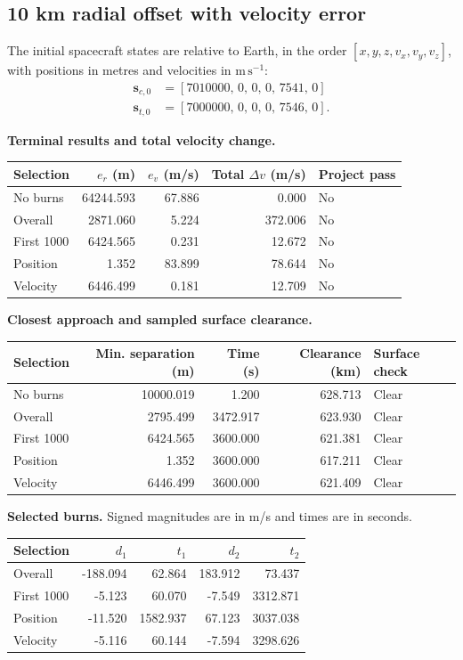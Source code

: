 \subsection{10 km radial offset with velocity error}
The initial spacecraft states are relative to Earth, in the order
$[x,y,z,v_x,v_y,v_z]$, with positions in metres and velocities in
$\mathrm{m\,s^{-1}}$:
\begin{align*}
\mathbf s_{c,0}&=[7010000,\,0,\,0,\,0,\,7541,\,0]\\
\mathbf s_{t,0}&=[7000000,\,0,\,0,\,0,\,7546,\,0].
\end{align*}
\par\noindent\textbf{Terminal results and total velocity change.}
\begin{center}
\begin{tabular}{lrrrl}
\toprule
Selection & $e_r$ (m) & $e_v$ (m/s) & Total $\Delta v$ (m/s) & Project pass\\
\midrule
No burns & 64244.593 & 67.886 & 0.000 & No\\
Overall & 2871.060 & 5.224 & 372.006 & No\\
First 1000 & 6424.565 & 0.231 & 12.672 & No\\
Position & 1.352 & 83.899 & 78.644 & No\\
Velocity & 6446.499 & 0.181 & 12.709 & No\\
\bottomrule
\end{tabular}
\end{center}
\par\noindent\textbf{Closest approach and sampled surface clearance.}
\begin{center}
\begin{tabular}{lrrrl}
\toprule
Selection & Min. separation (m) & Time (s) & Clearance (km) & Surface check\\
\midrule
No burns & 10000.019 & 1.200 & 628.713 & Clear\\
Overall & 2795.499 & 3472.917 & 623.930 & Clear\\
First 1000 & 6424.565 & 3600.000 & 621.381 & Clear\\
Position & 1.352 & 3600.000 & 617.211 & Clear\\
Velocity & 6446.499 & 3600.000 & 621.409 & Clear\\
\bottomrule
\end{tabular}
\end{center}
\par\noindent\textbf{Selected burns.} Signed magnitudes are in m/s and times are in seconds.
\begin{center}
\begin{tabular}{lrrrr}
\toprule
Selection & $d_1$ & $t_1$ & $d_2$ & $t_2$\\
\midrule
Overall & -188.094 & 62.864 & 183.912 & 73.437\\
First 1000 & -5.123 & 60.070 & -7.549 & 3312.871\\
Position & -11.520 & 1582.937 & 67.123 & 3037.038\\
Velocity & -5.116 & 60.144 & -7.594 & 3298.626\\
\bottomrule
\end{tabular}
\end{center}
